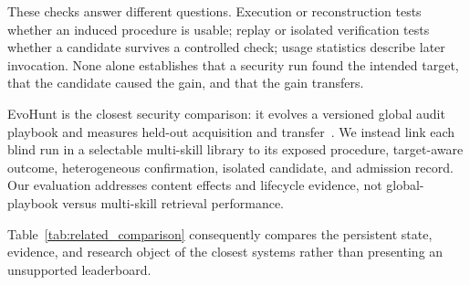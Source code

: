 \documentclass[11pt]{article}
\begin{document}
These checks answer different questions.  Execution or reconstruction tests whether an
induced procedure is usable; replay or isolated verification tests whether a candidate
survives a controlled check; usage statistics describe later invocation.  None alone
establishes that a security run found the intended target, that the candidate caused the
gain, and that the gain transfers.

EvoHunt is the closest security comparison: it evolves a versioned global audit playbook
and measures held-out acquisition and transfer~\cite{evohunt}.  We instead link each
blind run in a selectable multi-skill library to its exposed procedure, target-aware
outcome, heterogeneous confirmation, isolated candidate, and admission record.  Our
evaluation addresses content effects and lifecycle evidence, not global-playbook versus
multi-skill retrieval performance.

Table~\ref{tab:related_comparison} consequently compares the persistent state, evidence,
and research object of the closest systems rather than presenting an unsupported
leaderboard.
\end{document}
